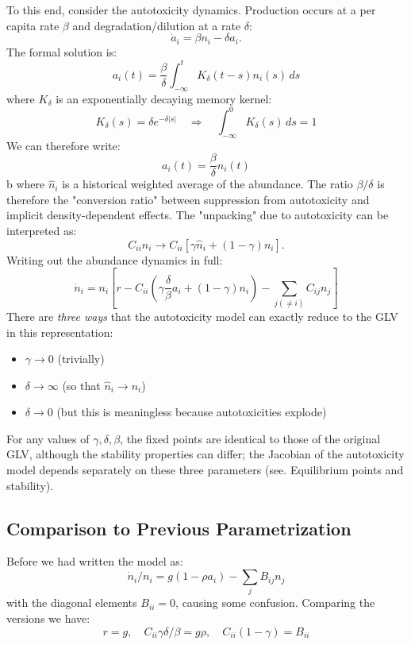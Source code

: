 \documentclass[11pt,a4paper,fleqn]{article}
\begin{document}
To this end, consider the autotoxicity dynamics. Production occurs at a per capita rate $\beta$ and degradation/dilution at a rate $\delta$:
\begin{equation}
\dot{a}_i = \beta n_i - \delta a_i.
\end{equation}
The formal solution is:
\begin{equation}
a_i(t) = \frac{\beta}{\delta} \int_{-\infty}^t K_\delta(t-s) n_i(s)\, ds
\end{equation}
where $K_\delta$ is an exponentially decaying memory kernel:
\begin{equation}
K_\delta(s) = \delta e^{-\delta|s|} \quad \Rightarrow \quad \int_{-\infty}^0 K_\delta(s)\, ds = 1
\end{equation}
We can therefore write:
\begin{equation}
a_i(t) = \frac{\beta}{\delta}\hat{n}_i(t)
\end{equation}b
where $\hat{n}_i$ is a historical weighted average of the abundance. The ratio $\beta/\delta$ is therefore the "conversion ratio" between suppression from autotoxicity and implicit density-dependent effects. The "unpacking" due to autotoxicity can be interpreted as:
\begin{equation}
C_{ii}n_i \rightarrow C_{ii}\left[ \gamma \hat{n}_i + (1-\gamma)n_i \right].
\end{equation}
Writing out the abundance dynamics in full:
\begin{equation}
\dot{n}_i = n_i\left[ r - C_{ii} \left(\gamma \frac{\delta}{\beta}a_i + (1-\gamma)n_i\right) - \sum_{j(\neq i)} C_{ij} n_j \right]
\end{equation}
There are \emph{three ways} that the autotoxicity model can exactly reduce to the GLV in this representation:
\begin{itemize}
  \item $\gamma \to 0$ (trivially)
  \item $\delta \to \infty$ (so that $\hat{n}_i \to n_i$)
  \item $\delta \to 0$ (but this is meaningless because autotoxicities explode)
\end{itemize}
For any values of $\gamma,\delta,\beta$, the fixed points are identical to those of the original GLV, although the stability properties can differ;
the Jacobian of the autotoxicity model depends separately on these three parameters (see. Equilibrium points and stability).

\subsection{Comparison to Previous Parametrization}
Before we had written the model as:
\begin{equation}
\dot{n}_i / n_i = g ( 1 - \rho a_i ) - \sum_{j} B_{ij} n_j
\end{equation}
with the diagonal elements $B_{ii}=0$, causing some confusion. Comparing the versions we have:
\begin{equation}
r=g, \quad C_{ii} \gamma \delta/\beta = g \rho, \quad C_{ii}(1-\gamma) = B_{ii}
\end{equation}
\end{document}

